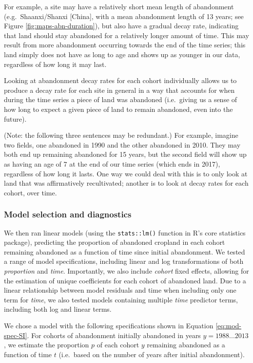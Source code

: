 \documentclass[9pt,twocolumn,twoside,]{pnas-new}
\begin{document}
For example, a site may have a relatively short mean length of abandonment (e.g.~Shaanxi/Shanxi {[}China{]}, with a mean abandonment length of 13 years; see Figure \ref{fig:maps-abn-duration}), but also have a gradual decay rate, indicating that land should stay abandoned for a relatively longer amount of time.
This may result from more abandonment occurring towards the end of the time series; this land simply does not have as long to age and shows up as younger in our data, regardless of how long it may last.

Looking at abandonment decay rates for each cohort individually allows us to produce a decay rate for each site in general in a way that accounts for when during the time series a piece of land was abandoned (i.e.~giving us a sense of how long to expect a given piece of land to remain abandoned, even into the future).

(Note: the following three sentences may be redundant.)
For example, imagine two fields, one abandoned in 1990 and the other abandoned in 2010.
They may both end up remaining abandoned for 15 years, but the second field will show up as having an age of 7 at the end of our time series (which ends in 2017), regardless of how long it lasts.
One way we could deal with this is to only look at land that was affirmatively recultivated; another is to look at decay rates for each cohort, over time.

\hypertarget{model-selection-and-diagnostics}{%
\subsubsection{Model selection and diagnostics}\label{model-selection-and-diagnostics}}

We then ran linear models (using the \texttt{stats::lm()} function in R's core statistics package), predicting the proportion of abandoned cropland in each cohort remaining abandoned as a function of time since initial abandonment.
We tested a range of model specifications, including linear and log transformations of both \emph{proportion} and \emph{time}.
Importantly, we also include \emph{cohort} fixed effects, allowing for the estimation of unique coefficients for each cohort of abandoned land.
Due to a linear relationship between model residuals and time when including only one term for \emph{time}, we also tested models containing multiple \emph{time} predictor terms, including both log and linear terms.

We chose a model with the following specifications shown in Equation \eqref{eq:mod-spec-SI}.
For cohorts of abandonment initially abandoned in years \(y = 1988 ... 2013\), we estimate the proportion \(p\) of each cohort \(y\) remaining abandoned as a function of time \(t\) (i.e.~based on the number of years after initial abandonment).
\end{document}
